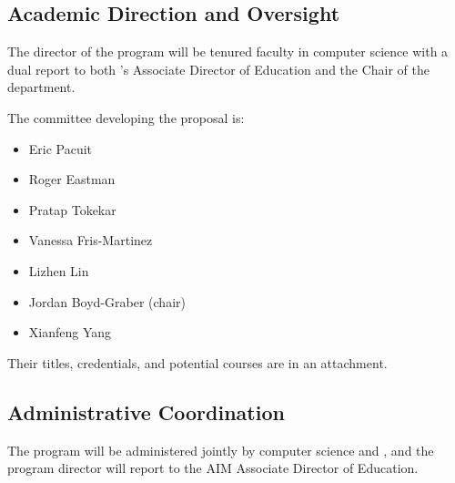 
\subsection{Academic Direction and Oversight}

The director of the program will be tenured faculty in computer science with a dual report to both \aim{}'s Associate Director of Education and the Chair of the  department.

The committee developing the proposal is:
\begin{itemize}
    \item Eric Pacuit
    \item Roger Eastman
    \item Pratap Tokekar
    \item Vanessa Fris-Martinez
    \item Lizhen Lin
    \item Jordan Boyd-Graber (chair)
    \item Xianfeng Yang
\end{itemize}

Their titles, credentials, and potential courses are in an attachment.

\subsection{Administrative Coordination}

The program will be administered jointly by computer science and \aim{}, and the program director will report to the AIM Associate Director of Education.  
